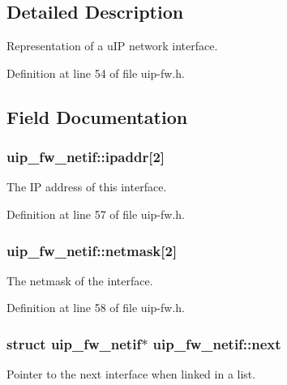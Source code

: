 \subsection{Detailed Description}
Representation of a uIP network interface. 

Definition at line 54 of file uip-\/fw.h.



\subsection{Field Documentation}
\hypertarget{structuip__fw__netif_a5333024be872ce9edbb61c50d4fe5c33}{
\subsubsection[{ipaddr}]{ {\bf uip\_\-fw\_\-netif::ipaddr}\mbox{[}2\mbox{]}}}
\label{structuip__fw__netif_a5333024be872ce9edbb61c50d4fe5c33}
The IP address of this interface. 

Definition at line 57 of file uip-\/fw.h.

\hypertarget{structuip__fw__netif_ad3688e474dcc678985d2ef39bab9db9f}{
\subsubsection[{netmask}]{ {\bf uip\_\-fw\_\-netif::netmask}\mbox{[}2\mbox{]}}}
\label{structuip__fw__netif_ad3688e474dcc678985d2ef39bab9db9f}
The netmask of the interface. 

Definition at line 58 of file uip-\/fw.h.

\hypertarget{structuip__fw__netif_a6e5ed4c2d8e622a64d832c177133e6eb}{
\subsubsection[{next}]{\setlength{\rightskip}{0pt plus 5cm}struct {\bf uip\_\-fw\_\-netif}$\ast$ {\bf uip\_\-fw\_\-netif::next}}}
\label{structuip__fw__netif_a6e5ed4c2d8e622a64d832c177133e6eb}
Pointer to the next interface when linked in a list. 

